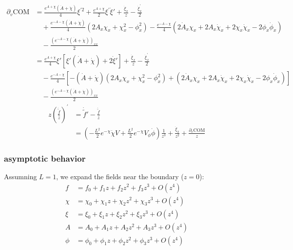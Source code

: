 \documentclass[12pt,a4paper]{ctexart}
\numberwithin{equation}{section}
\begin{document}
\begin{equation}
    \begin{aligned}
        \partial_v\mathrm{COM}&=\frac{e^{A+\chi}(\dot{A}+\dot{\chi})}{4}\xi^{\prime2}+\frac{e^{A+\chi}}{2}\xi^{\prime}\dot{\xi}'+\frac{\dot{\xi}_{x}}{z}-\frac{\dot{\xi}_{x}^{\prime}}{2}\\
        &\quad+\frac{e^{-A-\chi}(\dot{A}+\dot{\chi})}{4}(2A_x\chi_x+\chi_{x}^2-\phi_x^2)-\frac{e^{-A-\chi}}{4}(2\dot{A}_x\chi_x+2A_x\dot{\chi}_x+2\chi_{x}\dot{\chi}_{x}-2\phi_x\dot{\phi}_x)\\
        &\quad-\frac{(e^{-A-\chi}(\dot{A}+\dot{\chi}))_{xx}}{2}\\
        &=\frac{e^{A+\chi}}{4}\xi'[\xi'(\dot{A}+\dot{\chi})+2\dot{\xi}']+\frac{\dot{\xi}_{x}}{z}-\frac{\dot{\xi}_{x}^{\prime}}{2}\\
        &\quad-\frac{e^{-A-\chi}}{4}[-(\dot{A}+\dot{\chi})(2A_x\chi_x+\chi_{x}^2-\phi_x^2)+(2\dot{A}_x\chi_x+2A_x\dot{\chi}_x+2\chi_{x}\dot{\chi}_{x}-2\phi_x\dot{\phi}_x)]\\
        &\quad-\frac{(e^{-A-\chi}(\dot{A}+\dot{\chi}))_{xx}}{2}
    \end{aligned}
\end{equation}
\begin{equation}
    \begin{aligned}
        z(\frac{\dot{\tilde{f}}}{z})^{\prime}&=\dot{\tilde{f}}'-\frac{\dot{\tilde
        {f}}}{z}\\
        &=(-\frac{L^{2}}{2}e^{-\chi}\dot{\chi}V+\frac{L^{2}}{2}e^{-\chi}V_\phi\dot{\phi})\frac{1}{z^3}+\frac{\dot{\xi}_{x}}{z^2}+\frac{\partial_v\mathrm{COM}}{z}
    \end{aligned}
\end{equation}

\subsubsection{asymptotic behavior}

Assumning $L=1$, we expand the fields near the boundary ($z=0$):
\begin{equation}
    \begin{aligned}
        f&=f_0+f_1 z+f_2 z^2+f_3 z^3+O(z^4)\\
        \chi&=\chi_0+\chi_1 z+\chi_2 z^2+\chi_3 z^3+O(z^4)\\
        \xi&=\xi_0+\xi_1 z+\xi_2 z^2+\xi_3 z^3+O(z^4)\\
        A&=A_0+A_1 z+A_2 z^2+A_3 z^3+O(z^4)\\
        \phi&=\phi_0+\phi_1 z+\phi_2 z^2+\phi_3 z^3+O(z^4)\\
    \end{aligned}
\end{equation}
\end{document}
